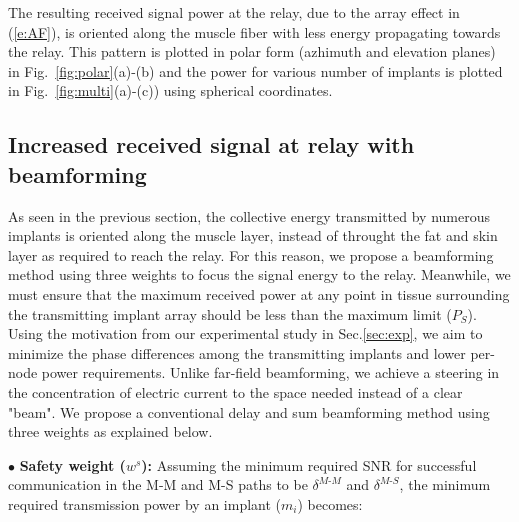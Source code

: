 The resulting received signal power at the relay, due to  the array effect in (\ref{e:AF}), is oriented along  the muscle fiber with less energy propagating towards the relay. This pattern is plotted in polar form (azhimuth and elevation planes) in Fig.~\ref{fig:polar}(a)-(b) and the power for various number of implants is plotted in  Fig.~\ref{fig:multi}(a)-(c)) using spherical coordinates.  %
  
 \subsection{Increased received signal at relay with beamforming} \label{bf}
 As seen in the previous section, the collective energy transmitted by numerous implants is oriented along the muscle layer, instead of throught the fat and skin layer as required to reach the relay. For this reason, we propose a beamforming method using three weights to focus the signal energy to the relay. Meanwhile, we must ensure that the maximum received power at any point in tissue surrounding the transmitting implant array should be less than the maximum limit ($P_S$). Using the motivation from our experimental study in  Sec.\ref{sec:exp}, we aim to minimize the phase differences among the transmitting implants and lower per-node power requirements. 
Unlike far-field beamforming, we achieve a steering in the concentration of electric current to the space needed instead of a clear "beam". We propose a conventional delay and sum beamforming method using three weights as explained below.

\noindent$\bullet$ \textbf{Safety weight ($w^s$):}
Assuming the minimum required SNR for successful communication in the M-M and M-S paths to be $\delta^{M\text{-}M}$ and $\delta^{M\text{-}S}$, the minimum required transmission power by an implant ($m_i$) becomes: 

